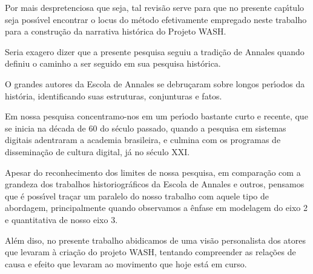 \documentclass[
12pt,		%
openright,	%
twoside,  %
a4paper,			%
chapter=TITLE,		%
english,			%
french,				%
spanish,			%
brazil				%
]{USPSC-classe/USPSC}
\begin{document}
Por mais despretenciosa que seja, tal revis\~ao serve para que no presente cap\'{\i}tulo seja poss\'{\i}vel encontrar o locus do m\'etodo efetivamente empregado neste trabalho para a constru\c{c}\~ao da narrativa hist\'orica do Projeto WASH.










Seria exagero dizer que a presente pesquisa seguiu a tradi\c{c}\~ao de Annales quando definiu o caminho a ser seguido em sua pesquisa hist\'orica.










O grandes autores da Escola de Annales se debru\c{c}aram sobre longos per\'{\i}odos da hist\'oria, identificando suas estruturas, conjunturas e fatos.










Em nossa pesquisa concentramo-nos em um per\'{\i}odo bastante curto e recente, que se inicia na d\'ecada de 60 do s\'eculo passado, quando a pesquisa em sistemas digitais adentraram a academia brasileira, e culmina com os programas de dissemina\c{c}\~ao de cultura digital, j\'a no s\'eculo XXI.










Apesar do reconhecimento dos limites de nossa pesquisa, em compara\c{c}\~ao com a grandeza dos trabalhos historiogr\'aficos da Escola de Annales e outros, pensamos que \'e poss\'{\i}vel tra\c{c}ar um paralelo do nosso trabalho com aquele tipo de abordagem, principalmente quando observamos a \^enfase em modelagem do eixo 2 e quantitativa de nosso eixo 3.










Al\'em diso, no presente trabalho abidicamos de uma vis\~ao personalista dos atores que levaram \`a cria\c{c}\~ao do projeto WASH, tentando compreender as rela\c{c}\~oes de causa e efeito que levaram ao movimento que hoje est\'a em curso.
\end{document}
